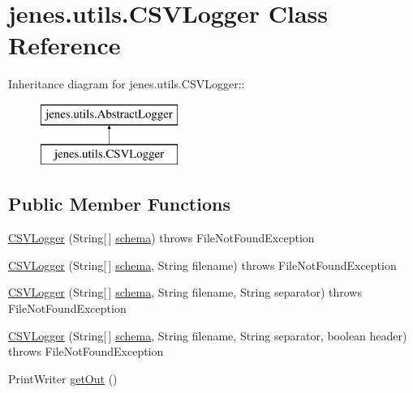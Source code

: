 \hypertarget{classjenes_1_1utils_1_1_c_s_v_logger}{
\section{jenes.utils.CSVLogger Class Reference}
\label{classjenes_1_1utils_1_1_c_s_v_logger}
}
Inheritance diagram for jenes.utils.CSVLogger::\begin{figure}[H]
\begin{center}
\leavevmode
\includegraphics[height=2cm]{classjenes_1_1utils_1_1_c_s_v_logger}
\end{center}
\end{figure}
\subsection*{Public Member Functions}
\begin{CompactItemize}
\item 
\hyperlink{classjenes_1_1utils_1_1_c_s_v_logger_8cac9e217f74d86b4e26b025d8e1381c}{CSVLogger} (String\mbox{[}$\,$\mbox{]} \hyperlink{classjenes_1_1utils_1_1_abstract_logger_3a2030876857a0512fae7e0ad400c570}{schema})  throws FileNotFoundException 
\item 
\hyperlink{classjenes_1_1utils_1_1_c_s_v_logger_52ccc76492a8a16e018198bcfa702360}{CSVLogger} (String\mbox{[}$\,$\mbox{]} \hyperlink{classjenes_1_1utils_1_1_abstract_logger_3a2030876857a0512fae7e0ad400c570}{schema}, String filename)  throws FileNotFoundException 
\item 
\hyperlink{classjenes_1_1utils_1_1_c_s_v_logger_d6242d77cf75372bfbf55e9b0973bfb4}{CSVLogger} (String\mbox{[}$\,$\mbox{]} \hyperlink{classjenes_1_1utils_1_1_abstract_logger_3a2030876857a0512fae7e0ad400c570}{schema}, String filename, String separator)  throws FileNotFoundException 
\item 
\hyperlink{classjenes_1_1utils_1_1_c_s_v_logger_d39241223c9d49bfa34a21db4aa1f8b1}{CSVLogger} (String\mbox{[}$\,$\mbox{]} \hyperlink{classjenes_1_1utils_1_1_abstract_logger_3a2030876857a0512fae7e0ad400c570}{schema}, String filename, String separator, boolean header)  throws FileNotFoundException 
\item 
PrintWriter \hyperlink{classjenes_1_1utils_1_1_c_s_v_logger_00671f9154ae65398d676e6526fa08f2}{getOut} ()
\end{CompactItemize}
